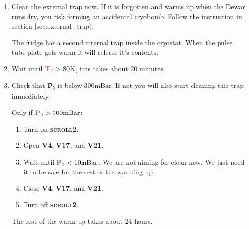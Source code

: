 \documentclass{article}[18pt,A4]
\newcommand{\mBar}{\mathrm{mBar}}
\newcommand{\kelvin}{\mathrm{K}}
\newcommand{\thing}[1]{{\color{gray}\textsc{ \textbf{#1}}}}
\newcommand{\valve}[1]{{\color{gray}\textbf{V#1}}}
\newcommand{\pressure}[1]{{\color{pressurecolor}\textbf{P}\textsubscript{#1}}}
\newcommand{\temperature}[1]{{\color{temperaturecolor}\textbf{T}\textsubscript{#1}}}
\begin{document}
\begin{enumerate}
    
    \item Clean the external trap now. If it is forgotten and warms up when the Dewar runs dry, you risk forming an accidental cryobomb. 
    Follow the instruction in section \ref{sec:external_trap}.
    
    The fridge has a second internal trap inside the cryostat.
    When the pulse tube plate gets warm it will release it's contents.
    
    \item Wait until $\temperature{2} > 80 \kelvin$, this takes about 20 minutes.
    \item Check that \pressure{3} is below  $ 300 \mBar$. 
    If not you will also start cleaning this trap immediately.
    
    Only if $\pressure{3} > 300 \mBar$: 
    \begin{enumerate}
     \item Turn on \thing{scroll2}.
     \item Open \valve{4}, \valve{17}, and \valve{21}.
     \item Wait until $\pressure{3} < 10 \mBar$.  We are not aiming for clean now. We just need it to be safe for the rest of the warming up.
     \item Close \valve{4}, \valve{17}, and \valve{21}.
     \item Turn off \thing{scroll2}.
    \end{enumerate}
    
    The rest of the warm up takes about 24 hours.
    
    
\end{enumerate}

\newpage
\end{document}
